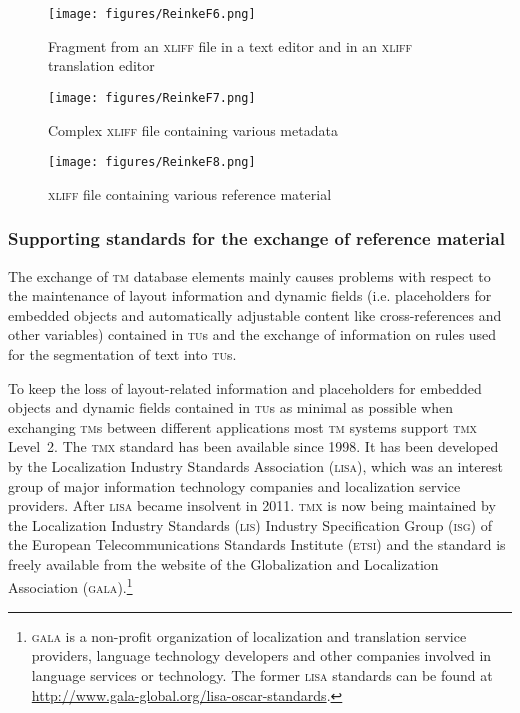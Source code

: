 \documentclass[output=paper]{LSP/langsci}
\begin{document}
\begin{figure}
\texttt{[image: figures/ReinkeF6.png]}
\caption{Fragment from an \textsc{xliff} file in a text editor and in an \textsc{xliff} translation editor}
\label{fig:reinke:6}
\end{figure}

\begin{figure}
\texttt{[image: figures/ReinkeF7.png]}
\caption{Complex \textsc{xliff} file containing various metadata}
\label{fig:reinke:7}
\end{figure}

\begin{figure}
\texttt{[image: figures/ReinkeF8.png]}
\caption{\textsc{xliff} file containing various reference material}
\label{fig:reinke:8}
\end{figure}

\subsubsection{Supporting standards for the exchange of reference material}\label{sec:reinke:2.5.3}

The exchange of \textsc{tm} database elements mainly causes problems with respect to the maintenance of layout information and dynamic fields (i.e. placeholders for embedded objects and automatically adjustable content like cross-references and other variables) contained in \textsc{tu}s and the exchange of information on rules used for the segmentation of text into \textsc{tu}s.

To keep the loss of layout-related information and placeholders for embedded objects and dynamic fields contained in \textsc{tu}s as minimal as possible when exchanging \textsc{tm}s between different applications most \textsc{tm} systems support \textsc{tmx} Level~2. The \textsc{tmx} standard has been available since 1998. It has been developed by the Localization Industry Standards Association (\textsc{lisa}), which was an interest group of major information technology companies and localization service providers. After \textsc{lisa} became insolvent in 2011. \textsc{tmx} is now being maintained by the Localization Industry Standards (\textsc{lis}) Industry Specification Group (\textsc{isg}) of the European Telecommunications Standards Institute (\textsc{etsi}) \citep{GALA2012} and the standard is freely available from the website of the Globalization and Localization Association (\textsc{gala}).\footnote{\textsc{gala} is a non-profit organization of localization and translation service providers, language technology developers and other companies involved in language services or technology. The former \textsc{lisa} standards can be found at \url{http://www.gala-global.org/lisa-oscar-standards}.}
 
\end{document}
